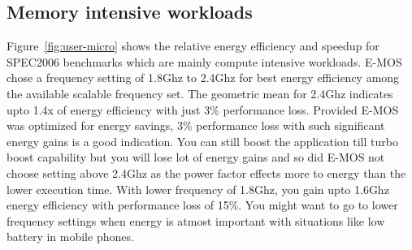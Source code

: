\subsection{Memory intensive workloads}
Figure~\ref{fig:user-micro} shows the relative energy efficiency and speedup
for SPEC2006 benchmarks which are mainly compute intensive workloads. 
E-MOS chose a frequency setting of 1.8Ghz to 2.4Ghz for best energy efficiency
among the available scalable frequency set. The geometric mean for 2.4Ghz indicates  
upto 1.4x of energy efficiency with just 3\% performance loss. Provided 
E-MOS was optimized for energy savings, 3\% performance loss with such significant energy gains
is a good indication. You can still boost the application till turbo boost capability
but you will lose lot of energy gains and so did E-MOS not choose setting
above 2.4Ghz as the power factor effects more to energy than the lower execution time.
With lower frequency of 1.8Ghz, you gain upto 1.6Ghz energy efficiency with performance loss
of 15\%. You might want to go to lower frequency settings when energy is atmost important with situations like
low battery in mobile phones.

